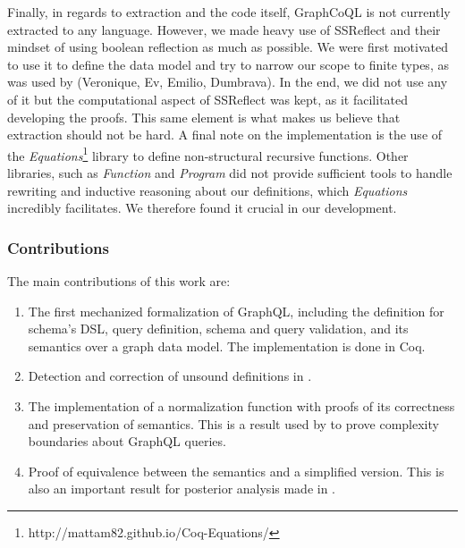 
Finally, in regards to extraction and the code itself, GraphCoQL is not currently extracted to any language. However, we made heavy use of SSReflect and their mindset of using boolean reflection as much as possible. We were first motivated to use it to define the data model and try to narrow our scope to finite types, as was used by (Veronique, Ev, Emilio, Dumbrava). In the end, we did not use any of it but the computational aspect of SSReflect was kept, as it facilitated developing the proofs. This same element is what makes us believe that extraction should not be hard.
A final note on the implementation is the use of the \textit{Equations}\footnote{http://mattam82.github.io/Coq-Equations/} library to define non-structural recursive functions. Other libraries, such as \textit{Function} and \textit{Program} did not provide sufficient tools to handle rewriting and inductive reasoning about our definitions, which \textit{Equations} incredibly facilitates. We therefore found it crucial in our development.

\subsubsection*{Contributions}
The main contributions of this work are:
\begin{enumerate}
    \item The first mechanized formalization of GraphQL, including the definition for schema's DSL, query definition, schema and query validation, and its semantics over a graph data model.  The implementation is done in Coq.
    \item Detection and correction of unsound definitions in \HP.
    \item The implementation of a normalization function with proofs of its correctness and preservation of semantics. This is a result used by \HP to prove complexity boundaries about GraphQL queries.
    \item Proof of equivalence between the semantics and a simplified version. This is also an important result for posterior analysis made in \HP.

\end{enumerate}

